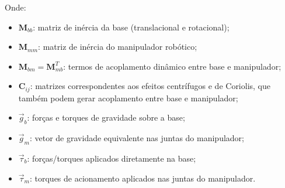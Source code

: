 Onde:
\begin{itemize}
    \item $\mathbf{M}_{bb}$: matriz de inércia da base (translacional e rotacional);
    \item $\mathbf{M}_{mm}$: matriz de inércia do manipulador robótico;
    \item $\mathbf{M}_{bm} = \mathbf{M}_{mb}^T$: termos de acoplamento dinâmico entre base e manipulador;
    \item $\mathbf{C}_{ij}$: matrizes correspondentes aos efeitos centrífugos e de Coriolis, que também podem gerar acoplamento entre base e manipulador;
    \item $\vec{g}_b$: forças e torques de gravidade sobre a base;
    \item $\vec{g}_m$: vetor de gravidade equivalente nas juntas do manipulador;
    \item $\vec{\tau}_b$: forças/torques aplicados diretamente na base;
    \item $\vec{\tau}_m$: torques de acionamento aplicados nas juntas do manipulador.
\end{itemize}